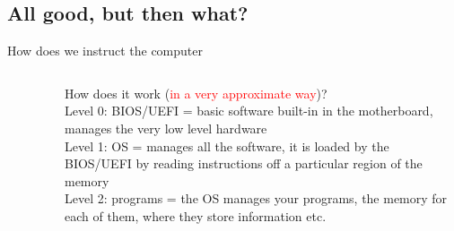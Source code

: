 \documentclass[10pt]{beamer}
\newcommand{\green}[1]{\textcolor{myGreen}{#1}}
\newcommand{\red}[1]{\textcolor{red}{#1}}
\renewcommand{\[}{\begin{equation*}}
\renewcommand{\]}{\end{equation*}}
\begin{document}
\subsection{All good, but then what?}
\begin{frame}{How does we instruct the computer}
\begin{columns}
\begin{column}{0.45\textwidth}
\begin{figure}
    \centering
    
\end{figure}
\end{column}
\begin{column}{0.55\textwidth}
How does it work (\red{in a very approximate way})?\\
\green{Level 0}: BIOS/UEFI = basic software built-in in the motherboard, manages the very low level hardware\\
\green{Level 1}: OS = manages all the software, it is loaded by the BIOS/UEFI by reading instructions off a particular region of the memory\\
\green{Level 2}: programs = the OS manages your programs, the memory for each of them, where they store information etc.
\end{column}
\end{columns}
\end{frame}
\end{document}
